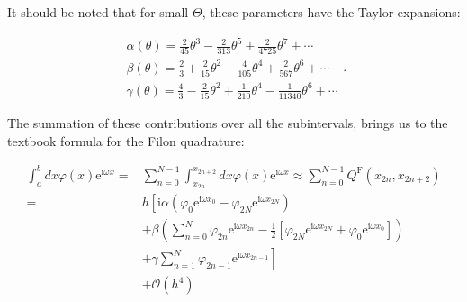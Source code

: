 It should be noted that for small $\Theta$, these parameters have the Taylor expansions:

\begin{equation}
    \begin{array}{l}
        \alpha(\theta)=\frac{2}{45} \theta^{3}-\frac{2}{313} \theta^{5}+\frac{2}{4725} \theta^{7}+\cdots \\
        \beta(\theta)=\frac{2}{3}+\frac{2}{15} \theta^{2}-\frac{4}{105} \theta^{4}+\frac{2}{567} \theta^{6}+\cdots \\
        \gamma(\theta)=\frac{4}{3}-\frac{2}{15} \theta^{2}+\frac{1}{210} \theta^{4}-\frac{1}{11340} \theta^{6}+\cdots
        \end{array}.
\end{equation}

The summation of these contributions over all the subintervals, brings us to the textbook formula for the Filon quadrature:

\begin{equation}
    \begin{aligned}
        \int_{a}^{b} d x \varphi(x) \mathrm{e}^{\mathrm{i} \omega x}=& \sum_{n=0}^{N-1} \int_{x_{2 n}}^{x_{2 n+2}} d x \varphi(x) \mathrm{e}^{\mathrm{i} \omega x} \approx \sum_{n=0}^{N-1} Q^{\text {F}}\left(x_{2 n}, x_{2 n+2}\right) \\
        =& h\left[\mathrm{i} \alpha\left(\varphi_{0} \mathrm{e}^{\mathrm{i} \omega x_{0}}-\varphi_{2 N} \mathrm{e}^{\mathrm{i} \omega x_{2 N}}\right)\right.\\
        &+\beta\left(\sum_{n=0}^{N} \varphi_{2 n} \mathrm{e}^{\mathrm{i} \omega x_{2 n}}-\frac{1}{2}\left[\varphi_{2 N} \mathrm{e}^{\mathrm{i} \omega x_{2 N}}+\varphi_{0} \mathrm{e}^{\mathrm{i} \omega x_{0}}\right]\right) \\
        &\left.+\gamma \sum_{n=1}^{N} \varphi_{2 n-1} \mathrm{e}^{\mathrm{i} \omega x_{2 n-1}}\right] \\
        &+\mathcal{O}\left(h^{4}\right)
    \end{aligned}
\end{equation}

